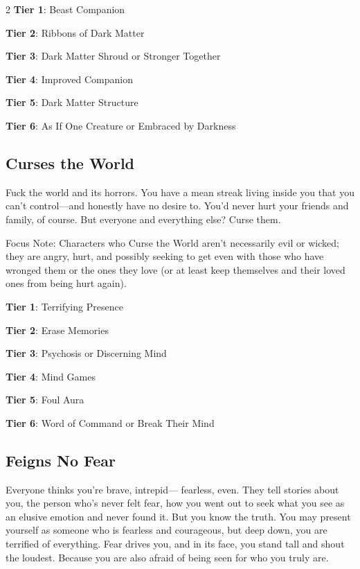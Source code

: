 \begin{multicols}{2}
\textbf{Tier 1}: Beast Companion

\textbf{Tier 2}: Ribbons of Dark Matter

\textbf{Tier 3}: Dark Matter Shroud or Stronger Together

\textbf{Tier 4}: Improved Companion

\textbf{Tier 5}: Dark Matter Structure

\textbf{Tier 6}: As If One Creature or Embraced by Darkness

\subsection{Curses the World}

Fuck the world and its horrors. You have a mean streak living inside you that you can’t control—and honestly have no desire to. You’d never hurt your friends and family, of course. But everyone and everything else? Curse them.

Focus Note: Characters who Curse the World aren’t necessarily evil or wicked; they are angry, hurt, and possibly seeking to get even with those who have wronged them or the ones they love (or at least keep themselves and their loved ones from being hurt again).

\textbf{Tier 1}: Terrifying Presence

\textbf{Tier 2}: Erase Memories

\textbf{Tier 3}: Psychosis or Discerning Mind

\textbf{Tier 4}: Mind Games

\textbf{Tier 5}: Foul Aura

\textbf{Tier 6}: Word of Command or Break Their Mind

\subsection{Feigns No Fear}

Everyone thinks you’re brave, intrepid— fearless, even. They tell stories about you, the person who’s never felt fear, how you went out to seek what you see as an elusive emotion and never found it. But you know the truth. You may present yourself as someone who is fearless and courageous, but deep down, you are terrified of everything. Fear drives you, and in its face, you stand tall and shout the loudest. Because you are also afraid of being seen for who you truly are.


\end{multicols}
